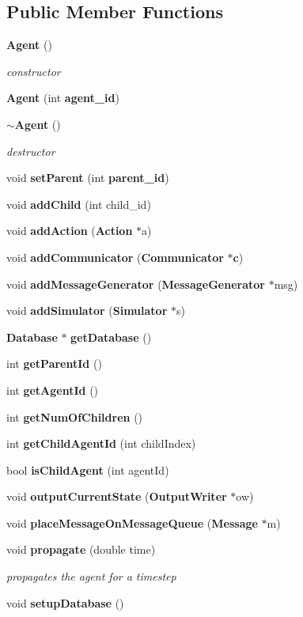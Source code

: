 \subsection*{Public Member Functions}
\begin{CompactItemize}
\item 
{\bf Agent} ()
\begin{CompactList}\small\item\em constructor \item\end{CompactList}\item 
{\bf Agent} (int {\bf agent\_\-id})
\item 
{\bf $\sim$Agent} ()
\begin{CompactList}\small\item\em destructor \item\end{CompactList}\item 
void {\bf setParent} (int {\bf parent\_\-id})
\item 
void {\bf addChild} (int child\_\-id)
\item 
void {\bf addAction} ({\bf Action} $\ast$a)
\item 
void {\bf addCommunicator} ({\bf Communicator} $\ast${\bf c})
\item 
void {\bf addMessageGenerator} ({\bf MessageGenerator} $\ast$msg)
\item 
void {\bf addSimulator} ({\bf Simulator} $\ast$s)
\item 
{\bf Database} $\ast$ {\bf getDatabase} ()
\item 
int {\bf getParentId} ()
\item 
int {\bf getAgentId} ()
\item 
int {\bf getNumOfChildren} ()
\item 
int {\bf getChildAgentId} (int childIndex)
\item 
bool {\bf isChildAgent} (int agentId)
\item 
void {\bf outputCurrentState} ({\bf OutputWriter} $\ast$ow)
\item 
void {\bf placeMessageOnMessageQueue} ({\bf Message} $\ast$m)
\item 
void {\bf propagate} (double time)
\begin{CompactList}\small\item\em propagates the agent for a timestep \item\end{CompactList}\item 
void {\bf setupDatabase} ()
\end{CompactItemize}
